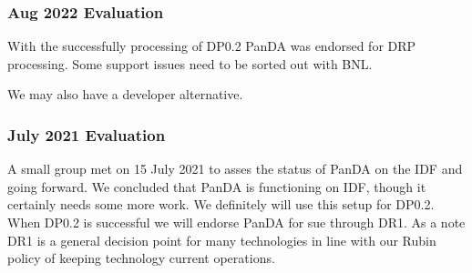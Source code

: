 \subsubsection{Aug 2022 Evaluation}
With the successfully processing of DP0.2 PanDA was endorsed for DRP processing.
Some support issues need to be sorted out with BNL.

We may also have a developer alternative.

\subsubsection{July 2021 Evaluation}
A small group met on 15 July 2021 to asses the status of PanDA on the IDF and going forward.
We  concluded  that PanDA is functioning on IDF, though it certainly needs some more work.
We definitely will use this setup for DP0.2.
When DP0.2 is  successful we will endorse PanDA for sue  through DR1.
As a note DR1 is a general decision point for many technologies in line with our Rubin policy of keeping technology current operations.

